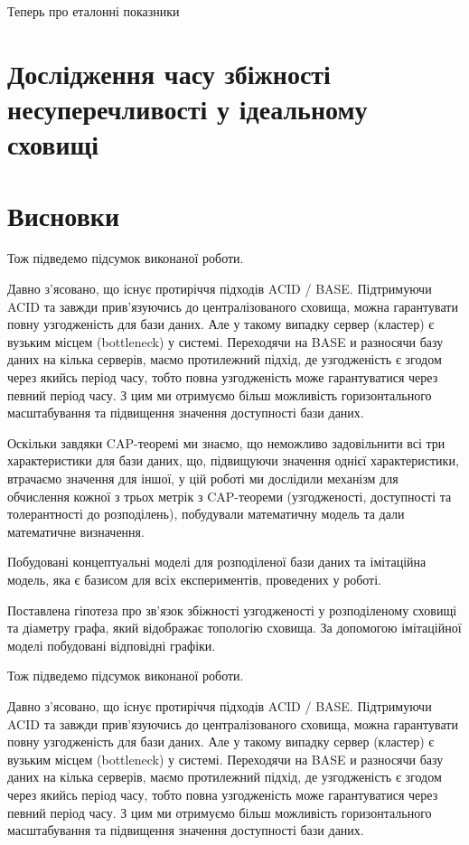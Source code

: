 \documentclass[14pt]{vakthesis}
\begin{document}
Теперь про еталонні показники 
\chapter{Дослідження часу збіжності несуперечливості у ідеальному сховищі}

\chapter{Висновки}
Тож підведемо підсумок виконаної роботи.

Давно з'ясовано, що існує протиріччя підходів ACID / BASE.
Підтримуючи ACID та завжди прив'язуючись до централізованого сховища, можна гарантувати повну узгодженість для бази даних.
Але у такому випадку сервер (кластер) є вузьким місцем (bottleneck) у системі.
Переходячи на BASE и разносячи базу даних на кілька серверів, маємо протилежний підхід, де узгодженість є згодом через якийсь період часу,
тобто повна узгодженість може гарантуватися через певний період часу. З цим ми отримуємо більш можливість горизонтального масштабування та
підвищення значення доступності бази даних.


Оскільки завдяки CAP-теоремі ми знаємо, що неможливо задовільнити всі три характеристики для бази даних, що, підвищуючи значення однієї характеристики,
втрачаємо значення
для іншої, у цій роботі ми дослідили механізм для обчислення кожної з трьох метрік з CAP-теореми
(узгодженості, доступності та толерантності до розподілень), побудували математичну модель та дали математичне визначення.

Побудовані концептуальні моделі для розподіленої бази даних та імітаційна модель, яка є базисом для всіх експериментів, проведених
у роботі.


Поставлена гіпотеза про зв'язок збіжності узгодженості у розподіленому сховищі та діаметру графа, який відображає топологію сховища.
За допомогою імітаційної моделі побудовані відповідні графіки.


Тож підведемо підсумок виконаної роботи.

Давно з'ясовано, що існує протиріччя підходів ACID / BASE.
Підтримуючи ACID та завжди прив'язуючись до централізованого сховища, можна гарантувати повну узгодженість для бази даних.
Але у такому випадку сервер (кластер) є вузьким місцем (bottleneck) у системі.
Переходячи на BASE и разносячи базу даних на кілька серверів, маємо протилежний підхід, де узгодженість є згодом через якийсь період часу,
тобто повна узгодженість може гарантуватися через певний період часу. З цим ми отримуємо більш можливість горизонтального масштабування та
підвищення значення доступності бази даних.
\end{document}
